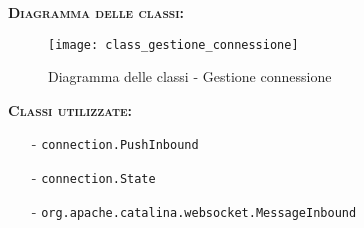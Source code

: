 \begin{description}
	\item{\scshape\bfseries Diagramma delle classi:}
\begin{figure}[H]
  \centering
  \texttt{[image: class\_gestione\_connessione]}
  \caption{Diagramma delle classi - Gestione connessione}\label{fig:gestioneconnessione}
\end{figure}
	
	\item{\scshape\bfseries Classi utilizzate:}
	\begin{itemize}[nolistsep, noitemsep]
	  \item[-] \texttt{connection.PushInbound}
	    \item[-] \texttt{connection.State}
	  \item[-] \texttt{org.apache.catalina.websocket.MessageInbound}
	\end{itemize}
\end{description}


